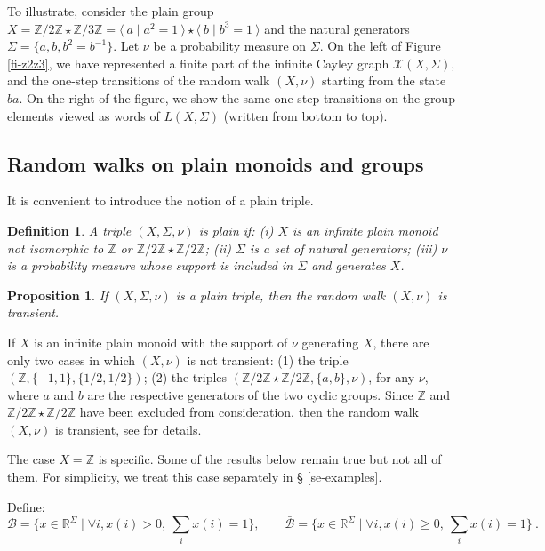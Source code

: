 \documentclass[11pt,a4paper]{article}
\newtheorem{proposition}[theorem]{Proposition}
\newtheorem{definition}[theorem]{Definition}
\theoremstyle{remark}
\def\Blackboardfont{\mathbb}
\newcommand{\pres}[2]{\langle \: #1 \mid #2 \: \rangle}
\def\cb{\cB}
\def\closcb{\bar{\cB}}
\def\Z{{\Blackboardfont Z}}
\def\R{{\Blackboardfont R}}
\def\cB{{\mathcal B}}
\def\cX{{\mathcal X}}
\begin{document}
To illustrate, consider the plain group $X=\Z/2\Z \star \Z/3\Z =
\pres{a}{a^2=1}\star \pres{b}{b^3=1}$ and the natural generators
$\Sigma = \{a,b,b^2=b^{-1}\}$. Let $\nu$ be a probability measure on
$\Sigma$. 
On the left of Figure \ref{fi-z2z3}, we
have represented a finite part of the infinite Cayley graph $\cX(X,\Sigma)$,
and the one-step transitions of the random walk $(X,\nu)$ starting
from the state $ba$. On the right of the figure, 
we show the same one-step transitions on the group elements viewed as
words of $L(X,\Sigma)$ (written from bottom to top). 


\subsection{Random walks on plain monoids and groups}

It is convenient to introduce the notion of a plain triple.

\begin{definition}\label{de-0aut3}
A triple $(X,\Sigma,\nu)$ is {\em plain} if: (i) $X$ is an
infinite plain monoid not isomorphic to $\Z$ or $\Z/2\Z \star
\Z/2\Z$; (ii) $\Sigma$ is a set of natural generators; (iii) $\nu$
is a probability measure whose support is included in $\Sigma$ and
generates $X$.
\end{definition}

\begin{proposition}\label{pr-transient}
If $(X,\Sigma, \nu)$ is a plain triple, then the random walk
$(X,\nu)$ is transient.
\end{proposition}

If $X$ is an infinite plain monoid with the support of $\nu$
generating $X$, there are only two cases in
which $(X,\nu)$ is not transient: (1) the triple $(\Z,\{-1,1\},
\{1/2,1/2\})$; (2) the triples $(\Z/2\Z\star \Z/2\Z ,\{a,b\},
\nu)$, for any $\nu$, where $a$ and $b$ are the respective
generators of the two cyclic groups. Since $\Z$ and $\Z/2\Z \star
\Z/2\Z$ have been excluded from consideration, then the random
walk $(X,\nu)$ is transient, see \cite{mair04} for details.


The case $X=\Z$ is specific. Some of the results below remain true
but not all of them. For simplicity, we treat this case separately in \S
\ref{se-examples}.

\medskip

Define:
\begin{equation}\label{eq-cb}
\cb = \{x\in \R^{\Sigma} \mid \forall i, x(i) >0, \ \sum_i x(i) =1
\}, \qquad \closcb = \{x\in \R^{\Sigma} \mid \forall i, x(i) \geq
0, \ \sum_i x(i) =1 \}\:.
\end{equation}
\end{document}

